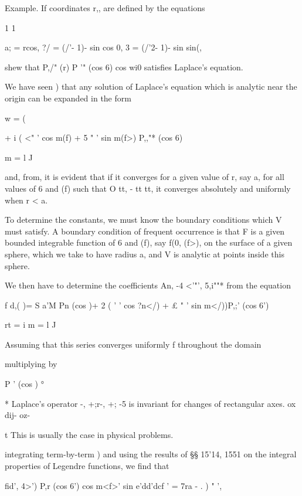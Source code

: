 Example. If coordinates r,, are defined by the equations

1 1

a; = rcos, ?/ = (/'- 1)- sin cos 0, 3 = (/'2- 1)- sin sin(,

shew that P,/" (r) P '" (cos 6) cos wi0 satisfies Laplace's equation.


We have seen ) that any solution of Laplace's equation which
is analytic near the origin can be expanded in the form

w = (

+ i ( <" ' cos m(f) + 5 " ' sin m(f>) P,,"* (cos 6) \

m = l J

and, from, it is evident that if it converges for a given value
of r, say a, for all values of 6 and (f) such that O tt, - tt tt, it
converges absolutely and uniformly when r < a.

To determine the constants, we must know the boundary conditions which
V must satisfy. A boundary condition of frequent occurrence is that F
is a given bounded integrable function of 6 and (f), say f(0, (f>), on
the surface of a given sphere, which we take to have radius a, and V
is analytic at points inside this sphere.

We then have to determine the coefficients An, -4 <'"', 5,i""* from
the equation

f d,( )= S a'M Pn (cos )+ 2 ( ' ' cos ?n</) + £ " ' sin m</))P,;' (cos
6')

rt = i m = l J

Assuming that this series converges uniformly f throughout the domain

multiplying by

P ' (cos ) °%

* Laplace's operator -, +;r-, +; -5 is invariant for changes of
rectangular axes. ox dij- oz-

t This is usually the case in physical problems.

%
%

integrating term-by-term ) and using the results of §§ 15'14,
1551 on the integral properties of Legendre functions, we find that

fid', 4>') P,r (cos 6') cos m<f>' sin e'dd'dcf ' = 7ra - . ) " ',


